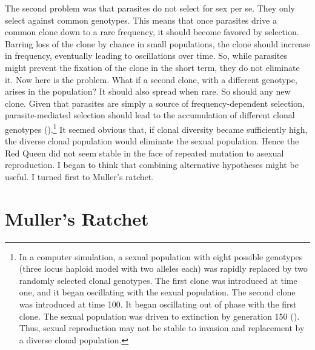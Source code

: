 \documentclass[
  american,
  letterpaper,
]{book}
\begin{document}
The second problem was that parasites do not select for sex per se. They
only select against common genotypes. This means that once parasites
drive a common clone down to a rare frequency, it should become favored
by selection. Barring loss of the clone by chance in small populations,
the clone should increase in frequency, eventually leading to
oscillations over time. So, while parasites might prevent the fixation
of the clone in the short term, they do not eliminate it. Now here is
the problem. What if a second clone, with a different genotype, arises
in the population? It should also spread when rare. So should any new
clone. Given that parasites are simply a source of frequency-dependent
selection, parasite-mediated selection should lead to the accumulation
of different clonal genotypes ().\footnote{In a computer simulation, a sexual population
  with eight possible genotypes (three locus haploid model with two
  alleles each) was rapidly replaced by two randomly selected clonal
  genotypes. The first clone was introduced at time one, and it began
  oscillating with the sexual population. The second clone was
  introduced at time 100. It began oscillating out of phase with the
  first clone. The sexual population was driven to extinction by
  generation 150 ().
  Thus, sexual reproduction may not be stable to invasion and
  replacement by a diverse clonal population.} It seemed obvious that,
if clonal diversity became sufficiently high, the diverse clonal
population would eliminate the sexual population. Hence the Red Queen
did not seem stable in the face of repeated mutation to asexual
reproduction. I began to think that combining alternative hypotheses
might be useful. I turned first to Muller's ratchet.

\section{Muller's Ratchet}\label{mullers-ratchet}
\end{document}
